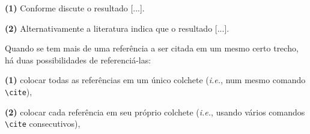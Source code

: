 \noindent\textbf{(1)} Conforme discute  o resultado [...].

\noindent\textbf{(2)} Alternativamente a literatura\cite{kim1996} indica que o resultado [...].

Quando se tem mais de uma referência a ser citada em um mesmo certo trecho, há duas possibilidades de referenciá-las:

\noindent\textbf{(1)} colocar todas as referências em um único colchete (\emph{i.e.}, num mesmo comando \verb+\cite+),


\cite{kim1996,Wikibooks2009}

	
\noindent\textbf{(2)} colocar cada referência em seu próprio colchete (\emph{i.e.}, usando vários comandos \verb+\cite+ consecutivos),


\cite{kim1996}\cite{Wikibooks2009}

